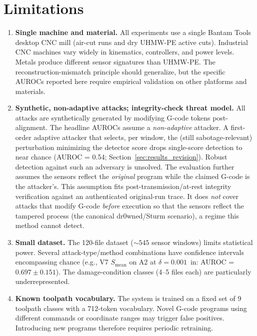 \section{Limitations}
\label{sec:limitations}

\begin{enumerate}
    \item \textbf{Single machine and material.}
    All experiments use a single Bantam Tools desktop CNC mill (air-cut runs and dry UHMW-PE active cuts).
    Industrial CNC machines vary widely in kinematics, controllers, and power levels.
    Metals produce different sensor signatures than UHMW-PE.
    The reconstruction-mismatch principle should generalize, but the specific AUROCs reported here require empirical validation on other platforms and materials.

    \item \textbf{Synthetic, non-adaptive attacks; integrity-check threat model.}
    All attacks are synthetically generated by modifying G-code tokens post-alignment.
    The headline AUROCs assume a \emph{non-adaptive} attacker.
    A first-order adaptive attacker that selects, per window, the (still sabotage-relevant) perturbation minimizing the detector score drops single-score detection to near chance (AUROC = 0.54; Section~\ref{sec:results_revision}).
    Robust detection against such an adversary is unsolved.
    The evaluation further assumes the sensors reflect the \emph{original} program while the claimed G-code is the attacker's.
    This assumption fits post-transmission/at-rest integrity verification against an authenticated original-run trace.
    It does \emph{not} cover attacks that modify G-code \emph{before} execution so that the sensors reflect the tampered process (the canonical dr0wned/Sturm scenario), a regime this method cannot detect.

    \item \textbf{Small dataset.}
    The 120-file dataset (${\sim}545$ sensor windows) limits statistical power.
    Several attack-type/method combinations have confidence intervals encompassing chance (e.g., V7 $S_{\text{mean}}$ on A2 at $\delta = 0.001$~in: AUROC = $0.697 \pm 0.151$).
    The damage-condition classes (4--5 files each) are particularly underrepresented.

    \item \textbf{Known toolpath vocabulary.}
    The system is trained on a fixed set of 9 toolpath classes with a 712-token vocabulary.
    Novel G-code programs using different commands or coordinate ranges may trigger false positives.
    Introducing new programs therefore requires periodic retraining.


\end{enumerate}
